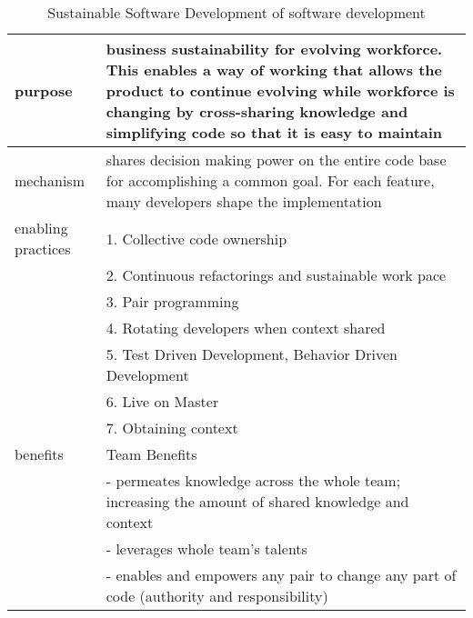 \documentclass{sig-alternate-05-2015}
\begin{document}
\begin{table*}[t]
\renewcommand{\arraystretch}{1.3}
\centering
\caption{Sustainable Software Development of software development}
\label{Practicesl}
\begin{tabular}{p{1.1in}p{5.0in}}
\hline
purpose            & business sustainability for evolving workforce. This enables a way of working that allows the product to continue evolving while workforce is changing by cross-sharing knowledge and simplifying code so that it is easy to maintain \\ 
\hline
mechanism          & shares decision making power on the entire code base for accomplishing a common goal. For each feature, many developers shape the implementation  \\ 
\hline
enabling practices & 1. Collective code ownership      \\ 
                   & 2. Continuous refactorings and sustainable work pace                     \\ 
                   & 3. Pair programming                                    \\ 
                   & 4. Rotating developers when context shared    \\ 
                   & 5. Test Driven Development, Behavior Driven Development     \\ 
                   & 6. Live on Master                 \\ 
                   & 7. Obtaining context  \\ 
\hline
benefits           & Team Benefits                                                                                                                                                                                  \\ 
                   & - permeates knowledge across the whole team; increasing the amount of shared knowledge and context                                                                                               \\ 
                   & - leverages whole team's talents                                                                                                                                                                 \\ 
                   & - enables and empowers any pair to change any part of code (authority and responsibility)                                                                                                        \\ 

\end{tabular}
\end{table*}
\end{document}
